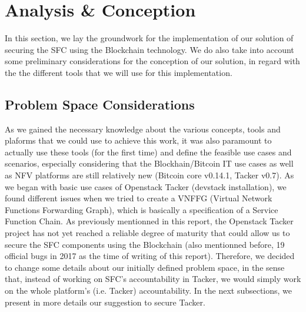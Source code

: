 \section{Analysis \& Conception} 
In this section, we lay the groundwork for the implementation of our solution of securing the SFC using the Blockchain technology. We do also take into account some preliminary considerations for the conception of our solution, in regard with the the different tools that we will use for this implementation.
\subsection{Problem Space Considerations}
As we gained the necessary knowledge about the various concepts, tools and plaforms that we could use to achieve this work, it was also paramount to actually use these tools (for the first time) and define the feasible use cases and scenarios, especially considering that the Blockhain/Bitcoin IT use cases as well as NFV platforms are still relatively new (Bitcoin core v0.14.1, Tacker v0.7). As we began with basic use cases of Openstack Tacker (devstack installation), we found different issues when we tried to create a VNFFG (Virtual Network Functions Forwarding Graph), which is basically a specification of a Service Function Chain. As previously mentionned in this report, the Openstack Tacker project has not yet reached a reliable degree of maturity that could allow us to secure the SFC components using the Blockchain (also mentionned before, 19 official bugs in 2017 as the time of writing of this report). Therefore, we decided to change some details about our initially defined problem space, in the sense that, instead of working on SFC's accountability in Tacker, we would simply work on the whole platform's (i.e. Tacker) accountability. In the next subsections, we present in more details our suggestion to secure Tacker.
